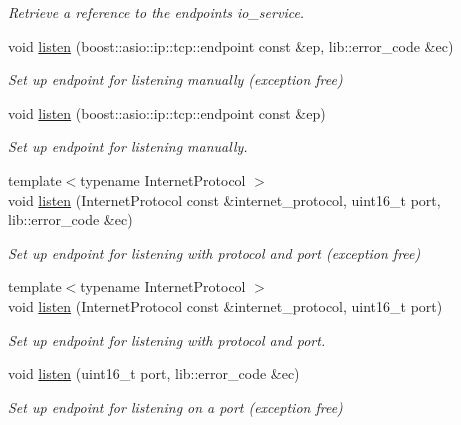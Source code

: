 \begin{DoxyCompactItemize}
\begin{DoxyCompactList}\small\item\em Retrieve a reference to the endpoint\textquotesingle{}s io\+\_\+service. \end{DoxyCompactList}\item 
void \hyperlink{classwebsocketpp_1_1transport_1_1asio_1_1endpoint_ac1efc0ab392ec98d3f6b0cca0eb14646}{listen} (boost\+::asio\+::ip\+::tcp\+::endpoint const \&ep, lib\+::error\+\_\+code \&ec)
\begin{DoxyCompactList}\small\item\em Set up endpoint for listening manually (exception free) \end{DoxyCompactList}\item 
void \hyperlink{classwebsocketpp_1_1transport_1_1asio_1_1endpoint_aec52c479e9baa0e0353285653a0bc7f1}{listen} (boost\+::asio\+::ip\+::tcp\+::endpoint const \&ep)
\begin{DoxyCompactList}\small\item\em Set up endpoint for listening manually. \end{DoxyCompactList}\item 
{\footnotesize template$<$typename Internet\+Protocol $>$ }\\void \hyperlink{classwebsocketpp_1_1transport_1_1asio_1_1endpoint_ae6813b9ecda67a13a78967f72e77b061}{listen} (Internet\+Protocol const \&internet\+\_\+protocol, uint16\+\_\+t port, lib\+::error\+\_\+code \&ec)
\begin{DoxyCompactList}\small\item\em Set up endpoint for listening with protocol and port (exception free) \end{DoxyCompactList}\item 
{\footnotesize template$<$typename Internet\+Protocol $>$ }\\void \hyperlink{classwebsocketpp_1_1transport_1_1asio_1_1endpoint_ad08b16daae1fac46679245ec7d0c8952}{listen} (Internet\+Protocol const \&internet\+\_\+protocol, uint16\+\_\+t port)
\begin{DoxyCompactList}\small\item\em Set up endpoint for listening with protocol and port. \end{DoxyCompactList}\item 
void \hyperlink{classwebsocketpp_1_1transport_1_1asio_1_1endpoint_ae7da6e2c944c3e1a087495b9d998dc8b}{listen} (uint16\+\_\+t port, lib\+::error\+\_\+code \&ec)
\begin{DoxyCompactList}\small\item\em Set up endpoint for listening on a port (exception free) \end{DoxyCompactList}\item 

\end{DoxyCompactItemize}
